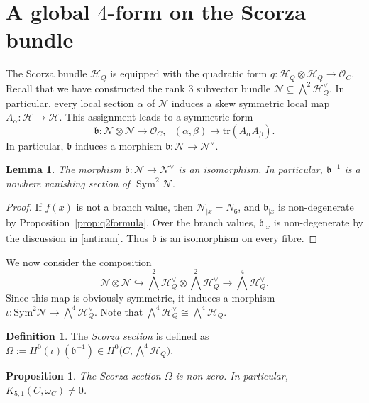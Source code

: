 \documentclass[11pt]{amsart}
\newtheorem{proposition}[theorem]{Proposition}
\newtheorem{lemma}[theorem]{Lemma}
\theoremstyle{definition}
\newtheorem{definition}[theorem]{Definition}
\def\OO{\mathcal{O}}
\def\cN{\mathcal{N}}
\def\cH{\mathcal{H}}
\begin{document}
\section{A global $4$-form on the Scorza bundle}

The Scorza bundle $\cH_Q$ is equipped with the quadratic form $q\colon \cH_Q\otimes \cH_Q\rightarrow \OO_C$. Recall that we have constructed the rank $3$ subvector bundle $\cN\subseteq \bigwedge^2 \cH_Q^{\vee}$. In particular, every local section $\alpha$ of $\cN$ induces a skew symmetric local map $A_{\alpha}\colon \cH\rightarrow \cH$.  This assignment leads to a symmetric form
$$\mathfrak{b}\colon \cN\otimes \cN\longrightarrow \OO_C, \ \ \ (\alpha, \beta)\mapsto \mathrm{tr}(A_{\alpha} A_{\beta}).$$
In particular, $\mathfrak{b}$ induces a morphism $\mathfrak{b} \colon \cN\rightarrow \cN^{\vee}$.




\begin{lemma}\label{lem:nondegeneracy-incidence-net}
The morphism $\mathfrak{b} \colon\mathcal N\to\mathcal N^\vee$ is an isomorphism. In particular, $\mathfrak{b}^{-1}$ is a nowhere vanishing section of $\operatorname{Sym}^2\mathcal N$.
\end{lemma}
\begin{proof}
If $f(x)$ is not a branch value, then $\cN_{|x}=N_6$, and $\mathfrak{b}_{|x}$ is non-degenerate by Proposition~\ref{prop:q2formula}. Over the branch values, $\mathfrak{b}_{|x}$ is non-degenerate by the discussion in \ref{antiram}. Thus $\mathfrak{b}$ is an isomorphism on every fibre.
\end{proof}







We now consider the composition 
$$\cN\otimes \cN\hookrightarrow \bigwedge^2 \cH_{Q}^{\vee}\otimes \bigwedge^2 \cH_Q^{\vee}\longrightarrow \bigwedge^4 \cH_Q^{\vee}.$$
Since this map is obviously symmetric, it induces a morphism $\iota\colon \mbox{Sym}^2 \cN\rightarrow \bigwedge^4 \cH_Q^{\vee}$. Note that $\bigwedge^4 \cH_Q^{\vee}\cong \bigwedge^4 \cH_Q$.

\begin{definition}\label{def:tautsect}
The  \emph{Scorza section} is defined as $\Omega:=H^0(\iota)(\mathfrak{b}^{-1})\in H^0\bigl(C,\bigwedge^4 \cH_Q\bigr)$.
\end{definition}




\begin{proposition}\label{prop:scorza-section}
The Scorza section $\Omega$ is non-zero. In particular, $K_{5,1}(C,\omega_C)\ne 0$.
\end{proposition}
\end{document}
